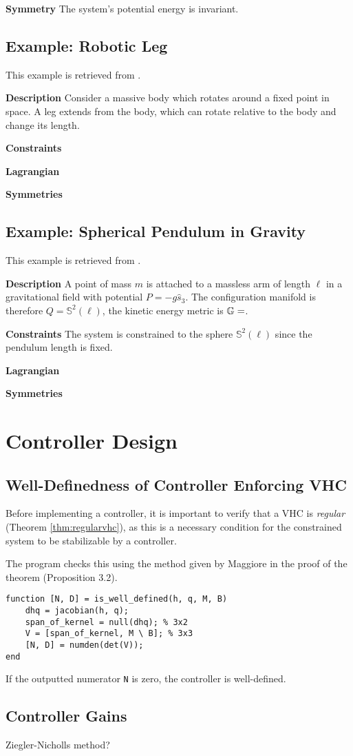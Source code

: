 \documentclass[main.tex]{subfiles}
\begin{document}
\textbf{Symmetry} The system's potential energy is invariant.

\subsection{Example: Robotic Leg} 
This example is retrieved from \cite[293]{bullo2019geometric}.%

\textbf{Description} Consider a massive body which rotates around a fixed point in space. A leg extends from the body, which can rotate relative to the body and change its length.

\textbf{Constraints}

\textbf{Lagrangian}

\textbf{Symmetries}

\subsection{Example: Spherical Pendulum in Gravity}
This example is retrieved from \cite[295]{bullo2019geometric}.%

\textbf{Description} A point of mass $m$ is attached to a massless arm of length $\ell$ in a gravitational field with potential $P=-g\hat{s}_3$. The configuration manifold is therefore $Q=\mathbb{S}^2(\ell)$, the kinetic energy metric is $\mathbb{G}=$.

\textbf{Constraints} The system is constrained to the sphere $\mathbb{S}^2(\ell)$ since the pendulum length is fixed.

\textbf{Lagrangian}

\textbf{Symmetries}


\section{Controller Design}
\subsection{Well-Definedness of Controller Enforcing VHC}
Before implementing a controller, it is important to verify that a VHC is \textit{regular} (Theorem \ref{thm:regularvhc}), as this is a necessary condition for the constrained system to be stabilizable by a controller.

The program checks this using the method given by Maggiore in the proof of the theorem (Proposition 3.2\cite{maggiore2012virtual}).
\begin{lstlisting}
function [N, D] = is_well_defined(h, q, M, B)
    dhq = jacobian(h, q);
    span_of_kernel = null(dhq); % 3x2
    V = [span_of_kernel, M \ B]; % 3x3
    [N, D] = numden(det(V));
end
\end{lstlisting}
If the outputted numerator \verb|N| is zero, the controller is well-defined. 
\subsection{Controller Gains}
Ziegler-Nicholls method?
\end{document}
